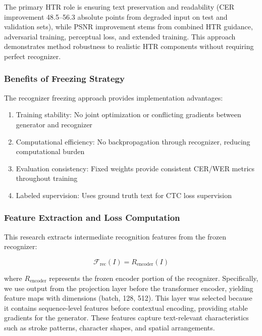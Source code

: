 \documentclass[journal]{IEEEtran}
\begin{document}
The primary HTR role is ensuring text preservation and readability (CER improvement 48.5--56.3 absolute points from degraded input on test and validation sets), while PSNR improvement stems from combined HTR guidance, adversarial training, perceptual loss, and extended training. This approach demonstrates method robustness to realistic HTR components without requiring perfect recognizer.

\subsubsection{Benefits of Freezing Strategy}

The recognizer freezing approach provides implementation advantages:
\begin{enumerate}[label=(\alph*)]
    \item Training stability: No joint optimization or conflicting gradients between generator and recognizer
    \item Computational efficiency: No backpropagation through recognizer, reducing computational burden
    \item Evaluation consistency: Fixed weights provide consistent CER/WER metrics throughout training
    \item Labeled supervision: Uses ground truth text for CTC loss supervision
\end{enumerate}

\subsubsection{Feature Extraction and Loss Computation}

This research extracts intermediate recognition features from the frozen recognizer:

\begin{equation}
\mathcal{F}_{\text{rec}}(I) = R_{\text{encoder}}(I)
\end{equation}

\noindent where $R_{\text{encoder}}$ represents the frozen encoder portion of the recognizer. Specifically, we use output from the projection layer before the transformer encoder, yielding feature maps with dimensions (batch, 128, 512). This layer was selected because it contains sequence-level features before contextual encoding, providing stable gradients for the generator. These features capture text-relevant characteristics such as stroke patterns, character shapes, and spatial arrangements.
\end{document}

